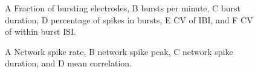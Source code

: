 \documentclass{article}
\begin{document}
\begin{figure}
  \centering
  \caption{A Fraction of bursting electrodes, B bursts per minute, C
burst duration, D percentage of spikes in bursts, E CV of IBI, and F
CV of within burst ISI.}
\end{figure}

\begin{figure}
  \centering
  \caption{A Network spike rate, B network spike peak, C network spike
duration, and D mean correlation.}
\end{figure}
\end{document}
